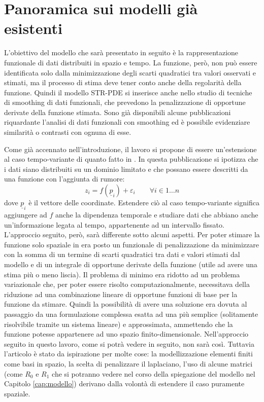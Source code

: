 \documentclass[a4paper,11pt,twoside,openright]{book}							%
\begin{document}
\chapter{Panoramica sui modelli già esistenti}
\label{cap:panoramica}

L'obiettivo del modello che sarà presentato in seguito è la rappresentazione funzionale di dati distribuiti in spazio e tempo. La funzione, però, non può essere identificata solo dalla minimizzazione degli scarti quadratici tra valori osservati e stimati, ma il processo di stima deve tener conto anche della regolarità della funzione. Quindi il modello STR-PDE si inserisce anche nello studio di tecniche di smoothing di dati funzionali, che prevedono la penalizzazione di opportune derivate della funzione stimata. Sono già disponibili alcune pubblicazioni riquardante l'analisi di dati funzionali con smoothing ed è possibile evidenziare similarità o contrasti con ognuna di esse. 

Come già accennato nell'introduzione, il lavoro si propone di essere un'estensione al caso tempo-variante di quanto fatto in \cite{art:sangalli}. In questa pubblicazione si ipotizza che i dati siano distribuiti su un dominio limitato e che possano essere descritti da una funzione con l'aggiunta di rumore:
$$
z_i=f(\underline{p}_i) + \varepsilon_i \qquad \forall i \in 1\ldots n
$$
dove $\underline{p}_i$ è il vettore delle coordinate. Estendere ciò al caso tempo-variante significa aggiungere ad $f$ anche la dipendenza temporale e studiare dati che abbiano anche un'informazione legata al tempo, appartenente ad un intervallo fissato. L'approccio seguito, però, sarà differente sotto alcuni aspetti. Per poter stimare la funzione solo spaziale in \cite{art:sangalli} era posto un funzionale di penalizzazione da minimizzare con la somma di un termine di scarti quadratici tra dati e valori stimati dal modello e di un integrale di opportune derivate della funzione (utile ad avere una stima più o meno liscia). Il problema di minimo era ridotto ad un problema variazionale che, per poter essere risolto computazionalmente, necessitava della riduzione ad una combinazione lineare di opportune funzioni di base per la funzione da stimare. Quindi la possibilità di avere una soluzione era dovuta al passaggio da una formulazione complessa esatta ad una più semplice (solitamente risolvibile tramite un sistema lineare) e approssimata, ammettendo che la funzione potesse appartenere ad uno spazio finito-dimensionale. Nell'approccio seguito in questo lavoro, come si potrà vedere in seguito, non sarà così. Tuttavia l'articolo è stato da ispirazione per molte cose: la modellizzazione elementi finiti come basi in spazio, la scelta di penalizzare il laplaciano, l'uso di alcune matrici (come $R_0$ e $R_1$ che si potranno vedere nel corso della spiegazione del modello nel Capitolo \ref{cap:modello}) derivano dalla volontà di estendere il caso puramente spaziale.
\end{document}
